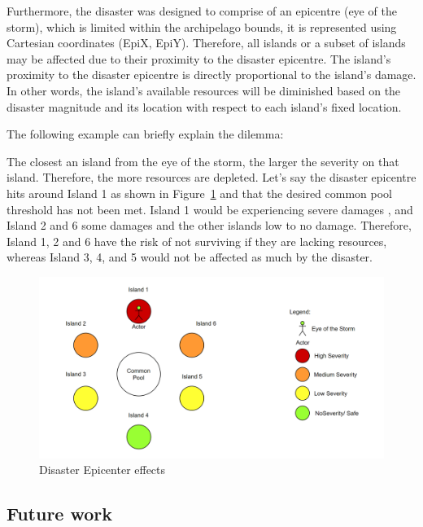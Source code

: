 Furthermore, the disaster was designed to comprise of an epicentre (eye of the storm), which is limited within the archipelago bounds, it is represented using Cartesian coordinates (EpiX, EpiY). Therefore, all islands or a subset of islands may be affected due to their proximity to the disaster epicentre. The island’s proximity to the disaster epicentre is directly proportional to the island’s damage. In other words, the island's available resources will be diminished based on the disaster magnitude and its location with respect to each island’s fixed location.

The following example can briefly explain the dilemma:

The closest an island from the eye of the storm, the larger the severity on that island. Therefore, the more resources are depleted. Let’s say the disaster epicentre hits around Island 1 as shown in Figure~\ref{fig:Disaster eye of the storm severity} and that the desired common pool threshold has not been met. Island 1 would be experiencing severe damages , and Island 2 and 6 some damages and the other islands low to no damage. Therefore, Island 1, 2 and 6 have the risk of not surviving if they are lacking resources, whereas Island 3, 4, and 5 would not be affected as much by the disaster.

\begin{figure}[!htb]
    \centering
    \includegraphics[width=1\textwidth]{04_environment/images/Disaster eye of the storm severity.PNG}
    \caption{Disaster Epicenter effects}
    \label{fig:Disaster eye of the storm severity}
\end{figure}

\newpage
\subsection{Future work}

